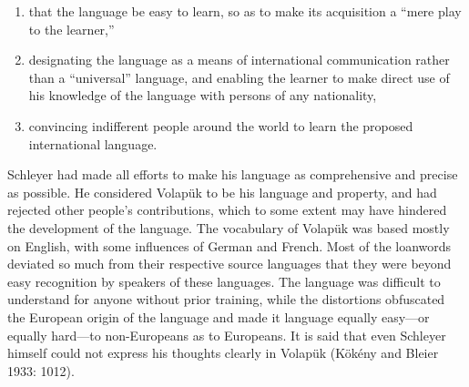 \begin{enumerate}
  \item that the language be easy to learn, so as to make its acquisition a ``mere play to the learner,''
  \item designating the language as a means of international communication rather than a ``universal'' language, and enabling the learner to make direct use of his knowledge of the language with persons of any nationality,
  \item convincing indifferent people around the world to learn the proposed international language.
\end{enumerate}

Schleyer had made all efforts to make his language as comprehensive and precise as possible.
He considered Volapük to be his language and property, and had rejected other people's contributions, which to some extent may have hindered the development of the language.
The vocabulary of Volapük was based mostly on English, with some influences of German and French.
Most of the loanwords deviated so much from their respective source languages that they were beyond easy recognition by speakers of these languages.
The language was difficult to understand for anyone without prior training, while the distortions obfuscated the European origin of the language and made it language equally easy---or equally hard---to non-Europeans as to Europeans.
It is said that even Schleyer himself could not express his thoughts clearly in Volapük
(Kökény and Bleier 1933: 1012).


